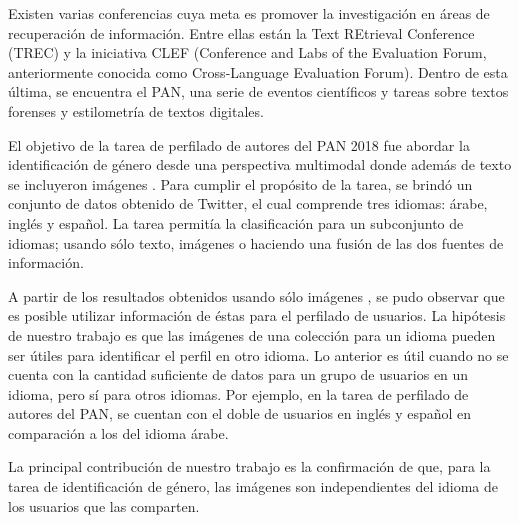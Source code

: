 \documentclass[runningheads]{llncs}
\begin{document}
Existen varias conferencias cuya meta 
es promover la investigación en áreas de recuperación
de información. Entre ellas están la Text REtrieval Conference (TREC) y la 
iniciativa CLEF (Conference and Labs of the Evaluation Forum, anteriormente 
conocida como Cross-Language Evaluation Forum). Dentro de esta última, se 
encuentra el PAN, una serie de eventos científicos y tareas sobre textos 
forenses y estilometría de textos digitales.

El objetivo de la tarea
de perfilado de autores del PAN 2018 fue abordar la identificación de género
desde una perspectiva multimodal donde además de texto se
incluyeron imágenes \cite{rangel_rosso_montes-y-gomez_potthast_stein}.
Para cumplir el propósito de la tarea, se brindó un conjunto de datos
obtenido de Twitter, el cual comprende tres idiomas: árabe, inglés y español.
La tarea permitía la clasificación para un subconjunto de idiomas; usando sólo texto, imágenes o haciendo una fusión de las dos fuentes de información.

A partir de los resultados obtenidos usando sólo imágenes 
 \cite{rangel_rosso_montes-y-gomez_potthast_stein}, se pudo observar que es posible 
utilizar información de éstas para el perfilado de usuarios.
La hipótesis de nuestro trabajo es que las imágenes de una colección para un
idioma  pueden ser útiles para identificar el perfil en otro idioma. 
Lo anterior es útil cuando no se cuenta con la cantidad suficiente de datos
para un grupo de usuarios en un idioma, pero sí para otros idiomas. Por ejemplo,
en la tarea de perfilado de autores del PAN, se cuentan con el doble de usuarios
en inglés y español en comparación a los del idioma árabe.

La principal contribución de nuestro trabajo es la confirmación
de que, para la tarea de identificación de género, las imágenes son independientes del 
idioma de los usuarios que las comparten. 

\end{document}
